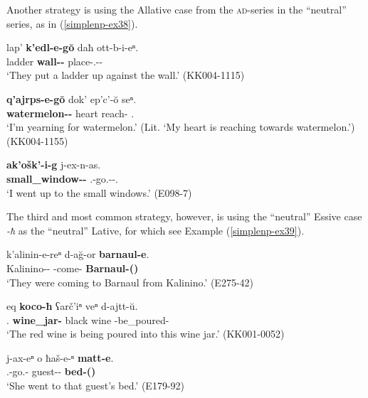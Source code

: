 Another strategy is using the Allative case from the \textsc{ad}-series in the ``neutral'' series, as in (\ref{simplenp-ex38}).

\begin{exe}
	\ex\label{simplenp-ex38}
	\begin{xlist}
		
		\ex\label{simplenp-ex38a}
		\gll lap' \textbf{k'edl-e-g\u{o}} daħ ott-b-i-eⁿ. \\
		ladder \textbf{wall-{\Obl}-{\All}} {\Pv} place-{\B}.{\Sg}-{\Tr}-{\Aor} \\
		\trans `They put a ladder up against the wall.'
		\hfill (KK004-1115)
		
		\ex\label{simplenp-ex38b}
		\gll \textbf{q'ajrps-e-g\u{o}} dok' ep'c'-\u{o} seⁿ. \\
		\textbf{watermelon-{\Obl}-{\All}} heart reach-{\Npst} {\Fsg}.{\Gen} \\
		\trans `I'm yearning for watermelon.' (Lit. `My heart is reaching towards watermelon.')
		\hfill (KK004-1155)
		
		\ex\label{simplenp-ex38c}
		\gll \textbf{ak'ošk'-i-g} j-ex-n-as. \\
		\textbf{small\_window-{\Pl}-{\All}} {\F}.{\Sg}-go.{\Pfv}-{\Aor}-{\Fsg}.{\Erg} \\
		\trans `I went up to the small windows.'
		\hfill (E098-7)
		
	\end{xlist}
\end{exe}

The third and most common strategy, however, is using the ``neutral'' Essive case \textit{-ħ}  as the ``neutral'' Lative, for which see Example (\ref{simplenp-ex39}).

\begin{exe}
	\ex\label{simplenp-ex39}
	\begin{xlist}
		
		\ex\label{simplenp-ex39a}
		\gll k'alinin-e-reⁿ d-a\u{g}-or \textbf{barnaul-e}. \\
		Kalinino-{\Obl}-{\Abl} {\D}-come-{\Imprf} \textbf{Barnaul-{\Obl}({\Ess})} \\
		\trans `They were coming to Barnaul from Kalinino.'
		\hfill (E275-42)
		
		\ex\label{simplenp-ex39b}
		\gll eq \textbf{koco-ħ} ʕarč'iⁿ veⁿ d-ajtt-\u{u}.\\
		{\Prox}.{\Obl} \textbf{wine\_jar-{\Ess}} black wine {\D}-be\_poured-{\Npst} \\
		\trans `The red wine is being poured into this wine jar.'
		\hfill (KK001-0052)
		
		\ex\label{simplenp-ex39c}
		\gll j-ax-eⁿ o ħaš-e-ⁿ \textbf{matt-e}. \\
		{\F}.{\Sg}-go.{\Pfv}-{\Aor} {\Dist} guest-{\Obl}-{\Gen} \textbf{bed-{\Obl}({\Ess})} \\
		\trans `She went to that guest's bed.'
		\hfill (E179-92)
		
	\end{xlist}
\end{exe}



